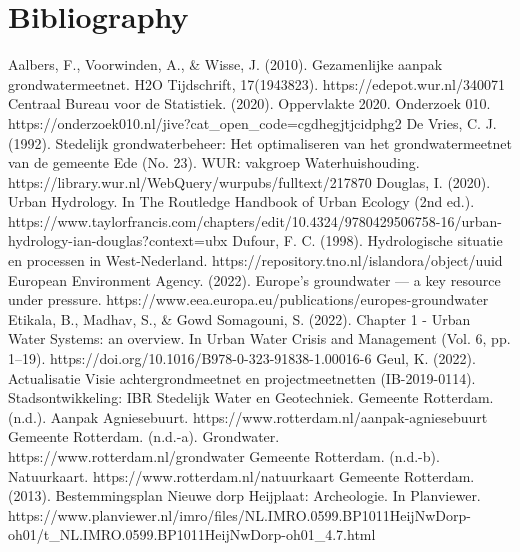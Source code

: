 \chapter{Bibliography}
\label{chapter:bibliography}

Aalbers, F., Voorwinden, A., & Wisse, J. (2010). Gezamenlijke aanpak grondwatermeetnet. H2O Tijdschrift, 17(1943823). https://edepot.wur.nl/340071
\newline
Centraal Bureau voor de Statistiek. (2020). Oppervlakte 2020. Onderzoek 010. https://onderzoek010.nl/jive?cat\_open\_code=cgdhegjtjcidphg2
\newline
De Vries, C. J. (1992). Stedelijk grondwaterbeheer: Het optimaliseren van het grondwatermeetnet van de gemeente Ede (No. 23). WUR: vakgroep Waterhuishouding. https://library.wur.nl/WebQuery/wurpubs/fulltext/217870
\newline
Douglas, I. (2020). Urban Hydrology. In The Routledge Handbook of Urban Ecology (2nd ed.). https://www.taylorfrancis.com/chapters/edit/10.4324/9780429506758-16/urban-hydrology-ian-douglas?context=ubx
\newline
Dufour, F. C. (1998). Hydrologische situatie en processen in West-Nederland. https://repository.tno.nl/islandora/object/uuid%
\newline
European Environment Agency. (2022). Europe’s groundwater — a key resource under pressure. https://www.eea.europa.eu/publications/europes-groundwater
\newline
Etikala, B., Madhav, S., & Gowd Somagouni, S. (2022). Chapter 1 - Urban Water Systems: an overview. In Urban Water Crisis and Management (Vol. 6, pp. 1–19). https://doi.org/10.1016/B978-0-323-91838-1.00016-6
\newline
Geul, K. (2022). Actualisatie Visie achtergrondmeetnet en projectmeetnetten (IB-2019-0114). Stadsontwikkeling: IBR Stedelijk Water en Geotechniek.
\newline
Gemeente Rotterdam. (n.d.). Aanpak Agniesebuurt. https://www.rotterdam.nl/aanpak-agniesebuurt
\newline
Gemeente Rotterdam. (n.d.-a). Grondwater. https://www.rotterdam.nl/grondwater
\newline
Gemeente Rotterdam. (n.d.-b). Natuurkaart. https://www.rotterdam.nl/natuurkaart
\newline
Gemeente Rotterdam. (2013). Bestemmingsplan Nieuwe dorp Heijplaat: Archeologie. In Planviewer. https://www.planviewer.nl/imro/files/NL.IMRO.0599.BP1011HeijNwDorp-oh01/t\_NL.IMRO.0599.BP1011HeijNwDorp-oh01\_4.7.html
